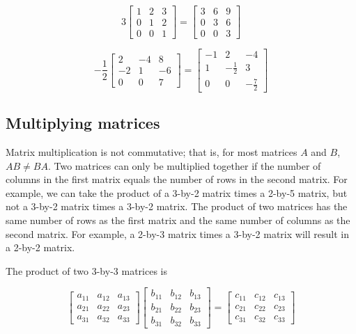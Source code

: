 $$3\begin{bmatrix}
1 & 2 & 3 \\
0 & 1 & 2 \\
0 & 0 & 1
\end{bmatrix} =
\begin{bmatrix}
3 & 6 & 9 \\
0 & 3 & 6 \\
0 & 0 & 3
\end{bmatrix}$$

\[
-\frac{1}{2}
\begin{bmatrix}
2 & -4 & 8 \\
-2 & 1 & -6 \\
0 & 0 & 7
\end{bmatrix}
=
\begin{bmatrix}
-1 & 2 & -4 \\
1 & -\frac{1}{2} & 3 \\
0 & 0 & -\frac{7}{2}
\end{bmatrix}
\]

\subsection{Multiplying matrices}
\label{sss:mult-9107}
Matrix multiplication is not commutative; that is, for most matrices $A$ and $B$, $AB \neq
BA$. Two matrices can only be multiplied together if the number of columns in the first
matrix equals the number of rows in the second matrix. For example, we can take the
product of a 3-by-2 matrix times a 2-by-5 matrix, but not a 3-by-2 matrix times a 3-by-2
matrix. The product of two matrices has the same number of rows as the first matrix and
the same number of columns as the second matrix. For example, a 2-by-3 matrix times a
3-by-2 matrix will result in a 2-by-2 matrix.


The product of two 3-by-3 matrices is

$$
\begin{bmatrix}
a _{11} & a _{12} & a _{13} \\
a _{21} & a _{22} & a _{23} \\
a _{31} & a _{32} & a _{33}
\end{bmatrix}
\begin{bmatrix}
b _{11} & b _{12} & b _{13} \\
b _{21} & b _{22} & b _{23} \\
b _{31} & b _{32} & b _{33}
\end{bmatrix} =
\begin{bmatrix}
c _{11} & c _{12} & c _{13} \\
c _{21} & c _{22} & c _{23} \\
c _{31} & c _{32} & c _{33}
\end{bmatrix}
$$



